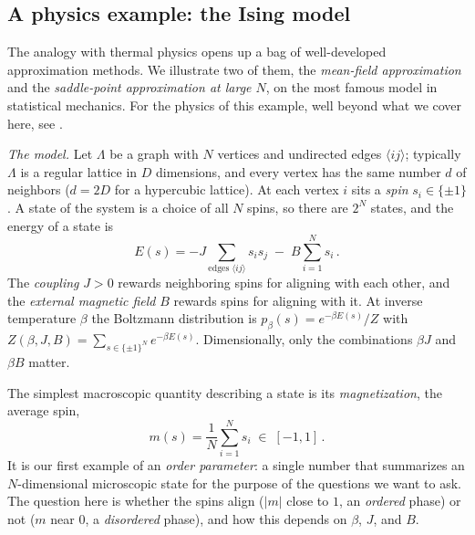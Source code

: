 \documentclass[11pt]{article}
\begin{document}
\subsection{A physics example: the Ising model}
\label{sec:ising-model}

The analogy with thermal physics opens up a bag of well-developed approximation methods. We illustrate two of them, the \emph{mean-field approximation} and the \emph{saddle-point approximation at large $N$}, on the most famous model in statistical mechanics. For the physics of this example, well beyond what we cover here, see \cite[Chapter 1]{TongSFT}.

\emph{The model.} Let $\Lambda$ be a graph with $N$ vertices and undirected edges $\langle ij\rangle$; typically $\Lambda$ is a regular lattice in $D$ dimensions, and every vertex has the same number $d$ of neighbors ($d=2D$ for a hypercubic lattice). At each vertex $i$ sits a \emph{spin} $s_i\in\{\pm 1\}$. A state of the system is a choice of all $N$ spins, so there are $2^N$ states, and the energy of a state is
%
\begin{equation}
    E(s) = -J\!\!\sum_{\text{edges }\langle ij\rangle}\!\! s_i s_j \;-\; B\sum_{i=1}^N s_i\,. \label{ising-E}
\end{equation}
%
The \emph{coupling} $J>0$ rewards neighboring spins for aligning with each other, and the \emph{external magnetic field} $B$ rewards spins for aligning with it. At inverse temperature $\beta$ the Boltzmann distribution is $p_\beta(s) = e^{-\beta E(s)}/Z$ with $Z(\beta,J,B) = \sum_{s\in\{\pm1\}^N} e^{-\beta E(s)}$. Dimensionally, only the combinations $\beta J$ and $\beta B$ matter.

The simplest macroscopic quantity describing a state is its \emph{magnetization}, the average spin,
%
\begin{equation}
    m(s) = \frac{1}{N}\sum_{i=1}^N s_i \;\in\; [-1,1]\,. \label{magnetization}
\end{equation}
%
It is our first example of an \emph{order parameter}: a single number that summarizes an $N$-dimensional microscopic state for the purpose of the questions we want to ask. The question here is whether the spins align ($|m|$ close to $1$, an \emph{ordered} phase) or not ($m$ near $0$, a \emph{disordered} phase), and how this depends on $\beta$, $J$, and $B$.
\end{document}
